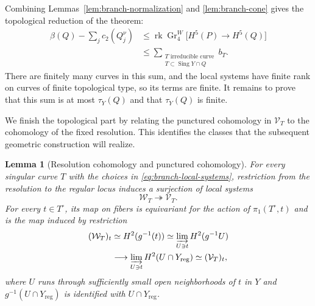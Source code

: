 \documentclass[11pt]{amsart}
\newtheorem{lemma}[theorem]{Lemma}
\theoremstyle{definition}
\theoremstyle{remark}
\numberwithin{equation}{section}
\DeclareMathOperator{\Sing}{Sing}
\DeclareMathOperator{\rk}{rk}
\DeclareMathOperator{\Gr}{Gr}
\begin{document}
Combining Lemmas~\ref{lem:branch-normalization} and
\ref{lem:branch-cone} gives the topological reduction of the theorem:
\begin{equation}\label{eq:branch-topological-bound}
 \begin{aligned}
 \beta(Q)-\sum_jc_2(Q_j^\nu)
 &\leq \rk\Gr^W_4\bigl[H^5(P)\longrightarrow H^5(Q)\bigr]\\
 &\leq
 \sum_{\substack{T\text{ irreducible curve}\\T\subset\Sing Y\cap Q}} b_T.
 \end{aligned}
\end{equation}
There are finitely many curves in this sum, and the local systems have
finite rank on curves of finite topological type, so its terms are
finite.  It remains to prove that this sum is at most $\tau_Y(Q)$ and
that $\tau_Y(Q)$ is finite.

We finish the topological part by relating the punctured cohomology
in $\mathcal V_T$ to the cohomology of the fixed resolution.  This
identifies the classes that the subsequent geometric construction
will realize.

\begin{lemma}[Resolution cohomology and punctured cohomology]
\label{lem:link-quotient}
For every singular curve $T$ with the choices in
\eqref{eq:branch-local-systems}, restriction from the resolution to
the regular locus induces a surjection of local systems
\begin{equation}\label{eq:branch-link-quotient}
 \mathcal W_T\twoheadrightarrow\mathcal V_T.
\end{equation}
For every $t\in T^\circ$, its map on fibers is equivariant for the
action of $\pi_1(T^\circ,t)$ and is the map induced by restriction
\begin{equation}\label{eq:branch-link-stalk-map}
 \begin{aligned}
 (\mathcal W_T)_t
 &\simeq H^2(g^{-1}(t))
  \simeq\varinjlim_{U\ni t}H^2(g^{-1}U)\\
 &\longrightarrow\varinjlim_{U\ni t}H^2(U\cap Y_{\mathrm{reg}})
  \simeq(\mathcal V_T)_t,
 \end{aligned}
\end{equation}
where $U$ runs through sufficiently small open neighborhoods of $t$
in $Y$ and $g^{-1}(U\cap Y_{\mathrm{reg}})$ is identified with
$U\cap Y_{\mathrm{reg}}$.
\end{lemma}
\end{document}
